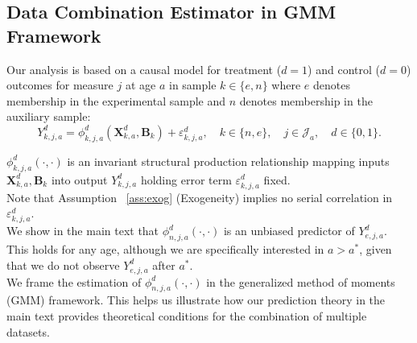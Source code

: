 


\usepackage[stable]{footmisc}

\newcommand*\leftright[2]{%
  \leavevmode
  \rlap{#1}%
  \hspace{0.5\linewidth}%
  #2}

\newcommand{\orth}{\ensuremath{\perp\!\!\!\perp}}%
\newcommand{\indep}{\orth}%
\newcommand{\notorth}{\ensuremath{\perp\!\!\!\!\!\!\diagup\!\!\!\!\!\!\perp}}%
\newcommand{\notindep}{\notorth}






\doublespacing
\subsection{Data Combination Estimator in GMM Framework} \label{section:gmm}

\noindent Our analysis is based on a causal model for treatment ($d=1$) and control ($d=0$) outcomes for measure $j$ at age $a$ in sample $k \in \{e,n\}$ where $e$ denotes membership in the experimental sample and $n$ denotes membership in the auxiliary sample:\\

\begin{equation}\label{eq:outcome}
Y^d_{k,j,a} = \phi^d_{k,j,a} (\bm{X}^d_{k,a}, \bm{B}_k) + \varepsilon^d_{k,j,a}, \quad k \in \{n,e\}, \quad j \in \mathcal{J}_a, \quad d \in \{0, 1\}. 
\end{equation}

\noindent $\phi^d_{k,j,a}\left( \cdot, \cdot \right)$ is an invariant structural production relationship mapping inputs $\bm{X}^d_{k,a}, \bm{B}_k$ into output $Y^d_{k,j,a}$ holding error term $\varepsilon^d_{k,j,a}$ fixed.\\

\noindent Note that Assumption ~\ref{ass:exog} (Exogeneity) implies no serial correlation in $ \varepsilon^d_{k,j,a}$.\\

\noindent We show in the main text that $\phi^d_{n,j,a} (\cdot, \cdot)$ is an unbiased predictor of $Y_{e,j,a}^d$. This holds for any age, although we are specifically interested in $a > a^*$, given that we do not observe $Y_{e,j,a}^d$ after $a^*$.\\

\noindent We frame the estimation of $\phi^d_{n,j,a} (\cdot, \cdot)$ in the generalized method of moments (GMM) framework. This helps us illustrate how our prediction theory in the main text provides theoretical conditions for the combination of multiple datasets.\\

